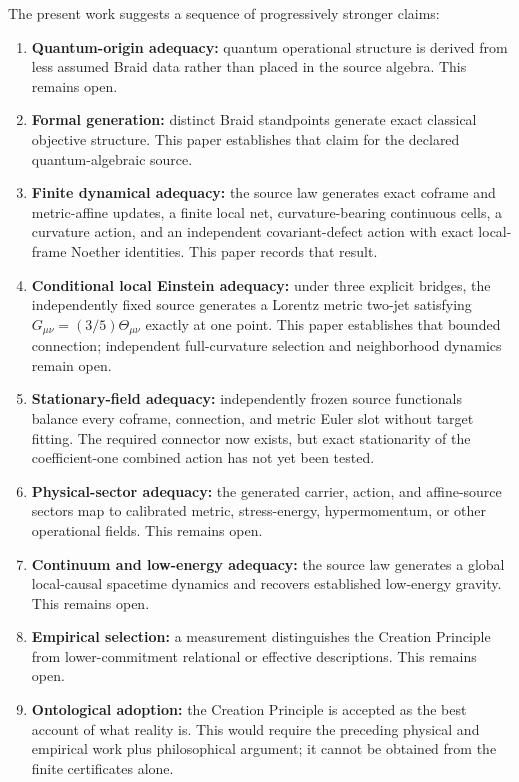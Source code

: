\documentclass[11pt]{article}
\theoremstyle{definition}
\theoremstyle{remark}
\begin{document}
The present work suggests a sequence of progressively stronger claims:
\begin{enumerate}
\item \textbf{Quantum-origin adequacy:} quantum operational structure is derived from less assumed Braid data rather than placed in the source algebra. This remains open.
\item \textbf{Formal generation:} distinct Braid standpoints generate exact classical objective structure. This paper establishes that claim for the declared quantum-algebraic source.
\item \textbf{Finite dynamical adequacy:} the source law generates exact coframe and metric-affine updates, a finite local net, curvature-bearing continuous cells, a curvature action, and an independent covariant-defect action with exact local-frame Noether identities. This paper records that result.
\item \textbf{Conditional local Einstein adequacy:} under three explicit bridges, the independently fixed source generates a Lorentz metric two-jet satisfying $G_{\mu\nu}=(3/5)\Theta_{\mu\nu}$ exactly at one point. This paper establishes that bounded connection; independent full-curvature selection and neighborhood dynamics remain open.
\item \textbf{Stationary-field adequacy:} independently frozen source functionals balance every coframe, connection, and metric Euler slot without target fitting. The required connector now exists, but exact stationarity of the coefficient-one combined action has not yet been tested.
\item \textbf{Physical-sector adequacy:} the generated carrier, action, and affine-source sectors map to calibrated metric, stress-energy, hypermomentum, or other operational fields. This remains open.
\item \textbf{Continuum and low-energy adequacy:} the source law generates a global local-causal spacetime dynamics and recovers established low-energy gravity. This remains open.
\item \textbf{Empirical selection:} a measurement distinguishes the Creation Principle from lower-commitment relational or effective descriptions. This remains open.
\item \textbf{Ontological adoption:} the Creation Principle is accepted as the best account of what reality is. This would require the preceding physical and empirical work plus philosophical argument; it cannot be obtained from the finite certificates alone.
\end{enumerate}
\end{document}
